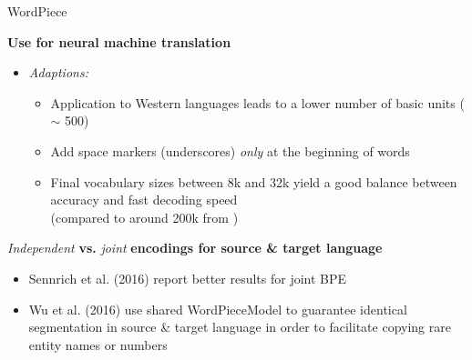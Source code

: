 \begin{frame}{WordPiece}

\vfill

	\textbf{Use for neural machine translation \href{https://arxiv.org/pdf/1609.08144.pdf}{}}

	\begin{itemize}
		\item \textit{Adaptions:} 
			\begin{itemize}
				\item Application to Western languages leads to a lower number of basic units ($\sim$ 500)
				\item Add space markers (underscores) \textit{only} at the beginning of words
				\item Final vocabulary sizes between 8k and 32k yield a good balance between accuracy and fast decoding speed\\(compared to around 200k from \href{https://storage.googleapis.com/pub-tools-public-publication-data/pdf/37842.pdf}{})
			\end{itemize}
	\end{itemize}
	
	\vspace{.3cm}
	
	\textit{Independent} \textbf{vs.} \textit{joint} \textbf{encodings for source \& target language}
	
	\begin{itemize}
		\item Sennrich et al. (2016) report better results for joint BPE
		\item Wu et al. (2016) use shared WordPieceModel to guarantee identical segmentation in source \& target language in order to facilitate copying rare entity names or numbers
	\end{itemize}
	
\vfill

\end{frame}


\endlecture

